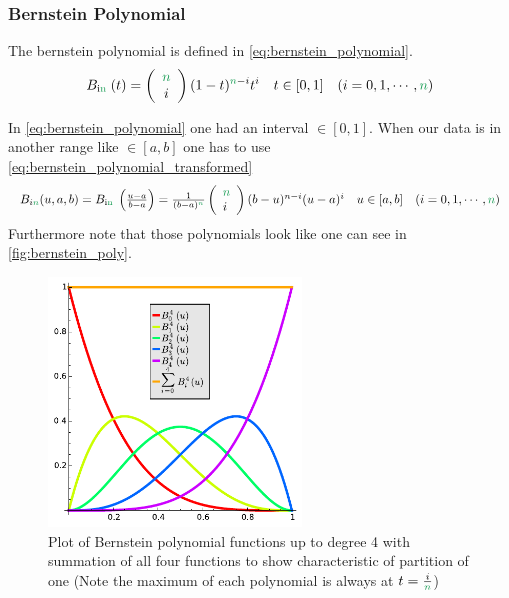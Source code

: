 \subsubsection{Bernstein Polynomial}
The bernstein polynomial is defined in \autoref{eq:bernstein_polynomial}.
\begin{equation}\label{eq:bernstein_polynomial}
B_{\text {i\textcolor{ForestGreen}{n} }}(t)=\left(\begin{array}{c}
\textcolor{ForestGreen}{n} \\
i
\end{array}\right)(1-t)^{\textcolor{ForestGreen}{n}-i} t^i \quad t \in[0,1] \quad(i=0,1, \cdots, \textcolor{ForestGreen}{n})
\end{equation}


In \autoref{eq:bernstein_polynomial} one had an interval $\in[0, 1]$. When our data is in another range like $\in[a, b]$ one has to use \autoref{eq:bernstein_polynomial_transformed}
\begin{equation}\label{eq:bernstein_polynomial_transformed}
\resizebox{1\textwidth}{!}{$
B_{i \textcolor{ForestGreen}{n}}(u, a, b)=B_{\text {i\textcolor{ForestGreen}{n} }}\left(\frac{u-a}{b-a}\right)=\frac{1}{(b-a)^{\textcolor{ForestGreen}{n}}}\left(\begin{array}{l}
\textcolor{ForestGreen}{n} \\
i
\end{array}\right)(b-u)^{n-i}(u-a)^i \quad u \in[a, b] \quad(i=0,1, \cdots, \textcolor{ForestGreen}{n})$}
\end{equation}
Furthermore note that those polynomials look like one can see in \autoref{fig:bernstein_poly}. 
\begin{figure}[ht!]
    \centering
    \includegraphics[width=0.6\textwidth]{images/bernstein_poly.pdf}
    \caption{Plot of Bernstein polynomial functions up to degree 4 with summation of all four functions to show characteristic of partition of one (Note the maximum of each polynomial is always at $t=\frac{i}{\textcolor{ForestGreen}{n}}$)}
    \label{fig:bernstein_poly}
\end{figure}
